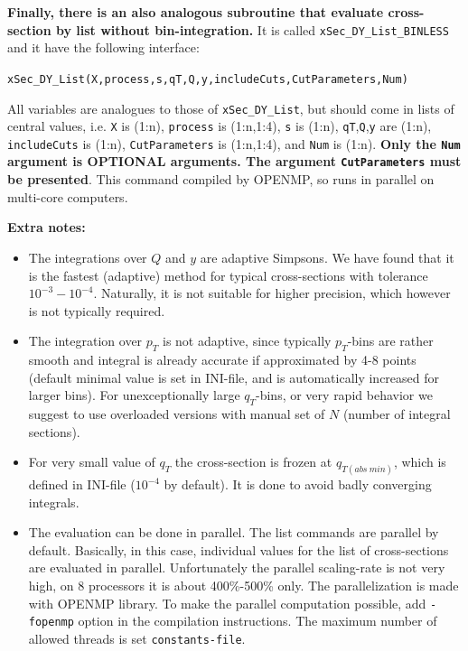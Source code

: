 \documentclass[prd,nofootinbib,eqsecnum,final]{revtex4}
\renewcommand{\(}{\left(}
\renewcommand{\)}{\right)}
\renewcommand{\[}{\left[}
\renewcommand{\]}{\right]}
\newcommand{\blue}[1]{{\color{blue} #1}}
\begin{document}
\begin{tcolorbox}
\textbf{Finally, \blue{there is an also analogous subroutine that evaluate cross-section by list without bin-integration.}} It is called \texttt{xSec\_DY\_List\_BINLESS} and it have the following interface:

\begin{center}
\texttt{xSec\_DY\_List(X,process,s,qT,Q,y,includeCuts,CutParameters,Num)}
\end{center}
All variables are analogues to those of \texttt{xSec\_DY\_List}, but should come in lists of central values, i.e. \texttt{X} is (1:n), \texttt{process} is (1:n,1:4), \texttt{s} is (1:n), \texttt{qT},\texttt{Q},\texttt{y} \blue{are (1:n)}, \texttt{includeCuts} is (1:n), \texttt{CutParameters} is (1:n,1:4), and \texttt{Num} is (1:n). \textbf{Only the \texttt{Num} argument is OPTIONAL arguments. The argument \texttt{CutParameters} must be presented}. This command compiled by OPENMP, so runs in parallel on multi-core computers.
\end{tcolorbox}

\textbf{Extra notes:}
\begin{itemize}
\item The integrations over $Q$ and $y$ are adaptive Simpsons. We have found that it is the fastest (adaptive) method for typical cross-sections with tolerance $10^{-3}-10^{-4}$. Naturally, it is not suitable for higher precision, which however is not typically required.
\item The integration over $p_T$ is not adaptive, since typically $p_T$-bins are rather smooth and integral is already accurate if approximated by 4-8 points (default minimal value is set in INI-file, and is automatically increased for larger bins). For unexceptionally large $q_T$-bins, or very rapid behavior we suggest to use overloaded versions with manual set of $N$ (number of integral sections).
\item For very small value of $q_T$ the cross-section is frozen at $q_{T(abs~min)}$, which is defined in INI-file ($10^{-4}$ by default). It is done to avoid badly converging integrals.
\item The evaluation can be done in parallel. The list commands are parallel by default. Basically, in this case, individual values for the list of cross-sections are evaluated in parallel. Unfortunately the parallel scaling-rate is not very high, on 8 processors it is about 400\%-500\% only. The parallelization is made with OPENMP library. To make the parallel computation possible, add \texttt{-fopenmp} option in the compilation instructions. The maximum number of allowed threads is set \texttt{constants-file}.
\end{itemize}
\end{document}
